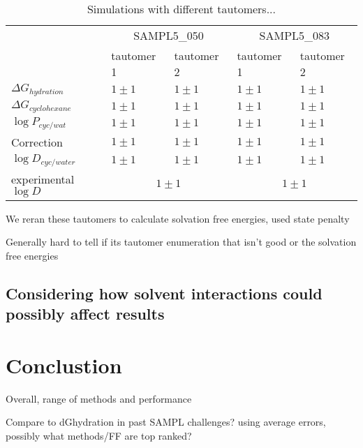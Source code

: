 \begin{table}
\begin{tabular}{l | l l | l l}
\hline
& \multicolumn{2}{|c|}{SAMPL5\_050} & \multicolumn{2}{c}{SAMPL5\_083} \\
& tautomer 1 & tautomer 2 & tautomer 1 & tautomer 2 \\
\hline
$\Delta G_{hydration}$ & $ 1 \pm 1 $ &  $ 1 \pm 1$ &  $1 \pm 1$ &  $1 \pm 1$ \\
$\Delta G_{cyclohexane}$ & $ 1 \pm 1 $ &  $ 1 \pm 1$ &  $1 \pm 1$ &  $1 \pm 1$ \\
$\log P_{cyc/wat}$ & $ 1 \pm 1 $ &  $ 1 \pm 1$ &  $1 \pm 1$ &  $1 \pm 1$ \\
Correction & $ 1 \pm 1 $ &  $ 1 \pm 1$ &  $1 \pm 1$ &  $1 \pm 1$ \\
$\log D_{cyc/water}$ & $ 1 \pm 1 $ &  $ 1 \pm 1$ &  $1 \pm 1$ &  $1 \pm 1$ \\
\hline
experimental $\log D$ & \multicolumn{2}{|c|}{$1 \pm 1$} & \multicolumn{2}{c}{$1 \pm 1$} \\
\hline
\end{tabular}
\label{tautomerChanges}
\caption{Simulations with different tautomers...}
\end{table}


We reran these tautomers to calculate solvation free energies, used state penalty %

Generally hard to tell if its tautomer enumeration that isn't good or the solvation free energies

\subsection{Considering how solvent interactions could possibly affect results} %
\label{results:7}

\section{Conclustion}
\label{conclusions}

Overall, range of methods and performance

Compare to dGhydration in past SAMPL challenges? using average errors, possibly what methods/FF are top ranked?

